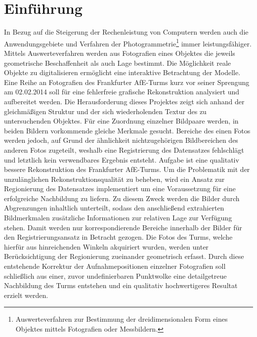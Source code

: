\chapter{Einf\"uhrung}
In Bezug auf die Steigerung der Rechenleistung von Computern werden auch die Anwendungsgebiete und Verfahren der Photogrammetrie\footnote{Auswerteverfahren zur Bestimmung der dreidimensionalen Form eines Objektes mittels Fotografien oder Messbildern.} immer leistungsf\"ahiger. Mittels Auswerteverfahren werden aus Fotografien eines Objektes die jeweils geometrische Beschaffenheit als auch Lage bestimmt. Die M\"oglichkeit reale Objekte zu digitalisieren erm\"oglicht eine interaktive Betrachtung der Modelle. \\
Eine Reihe an Fotografien des Frankfurter AfE-Turms kurz vor seiner Sprengung am 02.02.2014 soll f\"ur eine fehlerfreie grafische Rekonstruktion analysiert und aufbereitet werden. Die Herausforderung dieses Projektes zeigt sich anhand der gleichm\"a\ss igen Struktur und der sich wiederholenden Textur des zu untersuchenden Objektes. F\"ur eine Zuordnung einzelner Bildpaare werden, in beiden Bildern vorkommende gleiche Merkmale gesucht. Bereiche des einen Fotos werden jedoch, auf Grund der \"ahnlichkeit nichtzugeh\"origen Bildbereichen des anderen Fotos zugeteilt, weshalb eine Registrierung des Datensatzes fehlschl\"agt und letztlich kein verwendbares Ergebnis entsteht. 
Aufgabe ist eine qualitativ bessere Rekonstruktion des Frankfurter AfE-Turms. Um die Problematik mit der unzul\"anglichen Rekonstruktionsqualit\"at zu beheben, wird ein Ansatz zur Regionierung des Datensatzes implementiert um eine Voraussetzung f\"ur eine erfolgreiche Nachbildung zu liefern. Zu diesem Zweck werden die Bilder durch Abgrenzungen inhaltlich unterteilt, sodass  den anschlie\ss end extrahierten Bildmerkmalen zus\"atzliche Informationen zur relativen Lage zur Verf\"ugung stehen. Damit werden nur korrespondierende Bereiche innerhalb der Bilder f\"ur den Registrierungsansatz in Betracht gezogen. Die Fotos des Turms, welche hierf\"ur aus hinreichenden Winkeln akquiriert wurden, werden unter Ber\"ucksichtigung der Regionierung zueinander geometrisch erfasst. Durch diese entstehende Korrektur der Aufnahmepositionen einzelner Fotografien soll schlie\ss lich aus einer, zuvor undefinierbaren Punktwolke eine detailgetreue Nachbildung des Turms entstehen und ein qualitativ hochwertigeres Resultat erzielt werden.

